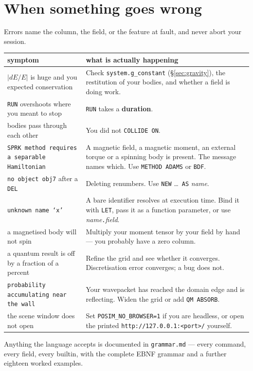 \documentclass[11pt]{article}
\newcommand{\kw}[1]{\texttt{\uppercase{#1}}}
\newcommand{\code}[1]{\texttt{#1}}
\begin{document}
\section{When something goes wrong}

Errors name the column, the field, or the feature at fault, and never
abort your session.

\begin{center}
\begin{tabular}{p{5.0cm}p{9.6cm}}
\textbf{symptom} & \textbf{what is actually happening}\\\hline
$|dE/E|$ is huge and you expected conservation & Check
\code{system.g\_constant} (\S\ref{sec:gravity}), the restitution of your
bodies, and whether a field is doing work.\\
\kw{run} overshoots where you meant to stop & \kw{run} takes a
\textbf{duration}.\\
bodies pass through each other & You did not \kw{collide on}.\\
\code{SPRK method requires a separable Hamiltonian} & A magnetic field,
a magnetic moment, an external torque or a spinning body is present.
The message names which. Use \kw{method adams} or \kw{bdf}.\\
\code{no object obj7} after a \kw{del} & Deleting renumbers. Use
\kw{new} \dots\ \kw{as} \emph{name}.\\
\code{unknown name `x'} & A bare identifier resolves at execution time.
Bind it with \kw{let}, pass it as a function parameter, or use
\emph{name}\code{.}\emph{field}.\\
a magnetised body will not spin & Multiply your moment tensor by your
field by hand --- you probably have a zero column.\\
a quantum result is off by a fraction of a percent & Refine the grid and
see whether it converges. Discretisation error converges; a bug does
not.\\
\code{probability accumulating near the wall} & Your wavepacket has
reached the domain edge and is reflecting. Widen the grid or add
\kw{qm absorb}.\\
the scene window does not open & Set \code{POSIM\_NO\_BROWSER=1} if you
are headless, or open the printed \code{http://127.0.0.1:<port>/}
yourself.\\
\end{tabular}
\end{center}

Anything the language accepts is documented in \code{grammar.md} ---
every command, every field, every builtin, with the complete EBNF
grammar and a further eighteen worked examples.
\end{document}

